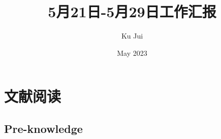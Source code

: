 \documentclass[letterpaper,12pt]{article}
\begin{document}
	
	
	\title{\songti {}5月21日-5月29日工作汇报}
	\author{\textrm{Ku Jui}}
	\date{\textrm{May 2023}}
	\maketitle
	
	\renewcommand{\figurename}{Figure} %
	\renewcommand{\contentsname}{Contents}
	\renewcommand{\tablename}{Table}
	\tableofcontents  %
	
	\section{文献阅读}
	
	\subsection{Pre-knowledge}
	
%	
%	
	
\end{document}
